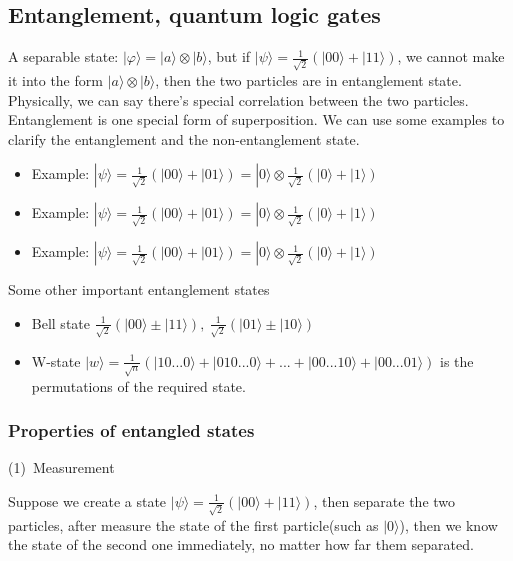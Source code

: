 \documentclass[UTF8,12pt]{article} %
\begin{document}
\subsection{Entanglement, quantum logic gates}
A separable state: $|\varphi\rangle = |a\rangle\otimes|b\rangle$, but if $|\psi\rangle = \frac{1}{\sqrt{2}}\left(|00\rangle + |11\rangle\right)$, we cannot make it into the form $|a\rangle\otimes|b\rangle$, then the two particles are in entanglement state. Physically, we can say there's special correlation between the two particles. Entanglement is one special form of superposition. We can use some examples to clarify the entanglement and the non-entanglement state.
\begin{itemize}
\item Example: $|\psi\rangle = \frac{1}{\sqrt{2}}\left(|00\rangle + |01\rangle\right) = |0\rangle\otimes\frac{1}{\sqrt{2}}\left(|0\rangle + |1\rangle\right)$
\item Example: $|\psi\rangle = \frac{1}{\sqrt{2}}\left(|00\rangle + |01\rangle\right) = |0\rangle\otimes\frac{1}{\sqrt{2}}\left(|0\rangle + |1\rangle\right)$
\item Example: $|\psi\rangle = \frac{1}{\sqrt{2}}\left(|00\rangle + |01\rangle\right) = |0\rangle\otimes\frac{1}{\sqrt{2}}\left(|0\rangle + |1\rangle\right)$
\end{itemize}
Some other important entanglement states
\begin{itemize}
\item Bell state $\frac{1}{\sqrt{2}}\left(|00\rangle \pm |11\rangle\right),~\frac{1}{\sqrt{2}}\left(|01\rangle \pm|10\rangle\right)$
\item W-state $|w\rangle = \frac{1}{\sqrt{n}}\left(|10...0\rangle + |010...0\rangle + ... + |00...10\rangle + |00...01\rangle\right)$ is the permutations of the required state.
\end{itemize}

\subsubsection{Properties of entangled states}
(1)~Measurement\\\par
Suppose we create a state $|\psi\rangle = \frac{1}{\sqrt{2}}\left(|00\rangle + |11\rangle\right)$, then separate the two particles, after measure the state of the first particle(such as $|0\rangle$), then we know the state of the second one immediately, no matter how far them separated.\\
\end{document}
